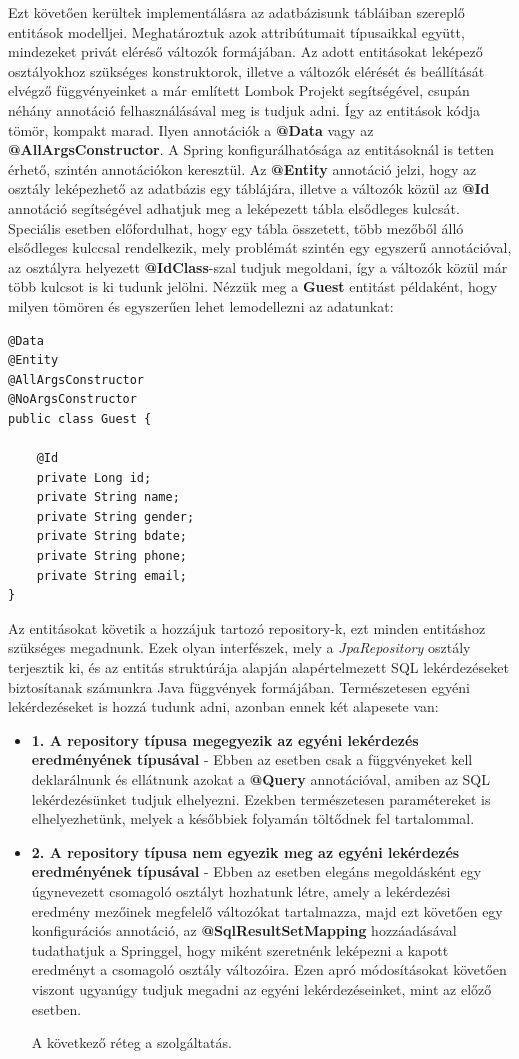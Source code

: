 \documentclass[12pt]{article}
\begin{document}
Ezt követően kerültek implementálásra az adatbázisunk tábláiban szereplő entitások modelljei. Meghatároztuk azok attribútumait típusaikkal együtt, mindezeket privát eléréső változók formájában. Az adott entitásokat leképező osztályokhoz szükséges konstruktorok, illetve a változók elérését és beállítását elvégző függvényeinket a már említett Lombok Projekt segítségével, csupán néhány annotáció felhasználásával meg is tudjuk adni. Így az entitások kódja tömör, kompakt marad. Ilyen annotációk a \textbf{@Data} vagy az \textbf{@AllArgsConstructor}. A Spring konfigurálhatósága az entitásoknál is tetten érhető, szintén annotációkon keresztül. Az \textbf{@Entity} annotáció jelzi, hogy az osztály leképezhető az adatbázis egy táblájára, illetve a változók közül az \textbf{@Id} annotáció segítségével adhatjuk meg a leképezett tábla elsődleges kulcsát. Speciális esetben előfordulhat, hogy egy tábla összetett, több mezőből álló elsődleges kulccsal rendelkezik, mely problémát szintén egy egyszerű annotációval, az osztályra helyezett \textbf{@IdClass}-szal tudjuk megoldani, így a változók közül már több kulcsot is ki tudunk jelölni. Nézzük meg a \textbf{Guest} entitást példaként, hogy milyen tömören és egyszerűen lehet lemodellezni az adatunkat:
\begin{verbatim}
@Data
@Entity
@AllArgsConstructor
@NoArgsConstructor
public class Guest {

    @Id
    private Long id;
    private String name;
    private String gender;
    private String bdate;
    private String phone;
    private String email;
}
\end{verbatim}

Az entitásokat követik a hozzájuk tartozó repository-k, ezt minden entitáshoz szükséges megadnunk. Ezek olyan interfészek, mely a \textit{JpaRepository} osztály terjesztik ki, és az entitás struktúrája alapján alapértelmezett SQL lekérdezéseket biztosítanak számunkra Java függvények formájában. Természetesen egyéni lekérdezéseket is hozzá tudunk adni, azonban ennek két alapesete van:
\begin{itemize}
	\item[]\textbf{1. A repository típusa megegyezik az egyéni lekérdezés eredményének típusával}
	- Ebben az esetben csak a függvényeket kell deklarálnunk és ellátnunk azokat a \textbf{@Query} annotációval, amiben az SQL lekérdezésünket tudjuk elhelyezni. Ezekben természetesen paramétereket is elhelyezhetünk, melyek a későbbiek folyamán töltődnek fel tartalommal.
	\item[]\textbf{2. A repository típusa nem egyezik meg az egyéni lekérdezés eredményének típusával}
	- Ebben az esetben elegáns megoldásként egy úgynevezett csomagoló osztályt hozhatunk létre, amely a lekérdezési eredmény mezőinek megfelelő változókat tartalmazza, majd ezt követően egy konfigurációs annotáció, az \textbf{@SqlResultSetMapping} hozzáadásával tudathatjuk a Springgel, hogy miként szeretnénk leképezni a kapott eredményt a csomagoló osztály változóira. Ezen apró módosításokat követően viszont ugyanúgy tudjuk megadni az egyéni lekérdezéseinket, mint az előző esetben.

A következő réteg a szolgáltatás.
\end{itemize}
\end{document}
